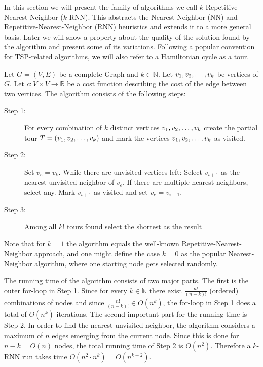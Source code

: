 In this section we will present the family of algorithms we call $k$-Repetitive-Nearest-Neighbor ($k$-RNN). 
This abstracts the Nearest-Neighbor (NN) and Repetitive-Nearest-Neighbor (RNN) heuristics and extends it to a more general basis.
Later we will show a property about the quality of the solution found by the algorithm and present some of its variations.
Following a popular convention for TSP-related algorithms, we will also refer to a Hamiltonian cycle as a tour. 	

Let $G = (V, E)$ be a complete Graph and $k \in \mathbb{N}$. Let $v_1, v_2, \mathellipsis, v_k$ be vertices of $G$. 
Let $c: V \times V \rightarrow \mathbb{R}$ be a cost function describing the cost of the edge between two vertices. 
The algorithm consists of the following steps:


\begin{description}
	\item[Step 1:] For every combination of $k$ distinct vertices $v_1, v_2, \mathellipsis, v_k$ create the partial tour $T = (v_1, v_2, \mathellipsis, v_k)$ and mark the vertices $v_1, v_2, \mathellipsis, v_k$ as visited.
	
	\item[Step 2:] Set $v_e = v_k$. While there are unvisited vertices left: 
	Select $v_{i+1}$ as the nearest unvisited neighbor of $v_e$. 
	If there are multiple nearest neighbors, select any.
	Mark $v_{i+1}$ as visited and set $v_e = v_{i+1}$.
	
	\item[Step 3:] Among all $k!$ tours found select the shortest as the result
\end{description}	

Note that for $k = 1$ the algorithm equals the well-known Repetitive-Nearest-Neighbor approach, and one might define the case $k = 0$ as the popular Nearest-Neighbor algorithm, where one starting node gets selected randomly.

The running time of the algorithm consists of two major parts. 
The first is the outer for-loop in Step 1. 
Since for every $k \in \mathbb{N}$ there exist $\frac{n!}{(n-k)!}$ (ordered) combinations of nodes and since $\frac{n!}{(n-k)!} \in O(n^k)$, the for-loop in Step 1 does a total of $O(n^k)$ iterations.
The second important part for the running time is Step 2. In order to find the nearest unvisited neighbor, the algorithm considers a maximum of $n$ edges emerging from the current node. 
Since this is done for $n - k = O(n)$ nodes, the total running time of Step 2 is $O(n^2)$.
Therefore a $k$-RNN run takes time $O(n^2 \cdot n^k) = O(n^{k+2})$.

